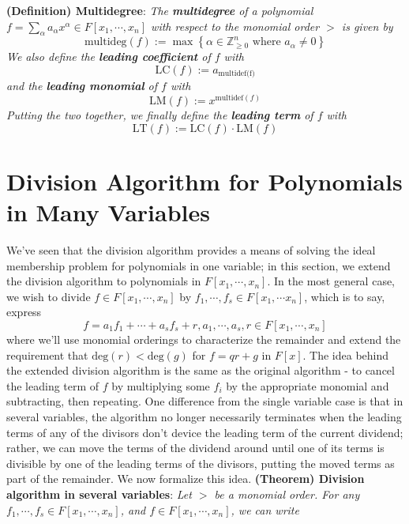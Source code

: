 \documentclass{article}
\begin{document}
\newline \newline
\textbf{(Definition) Multidegree}: \textit{The \textbf{multidegree} of a polynomial $ f = \sum_{\alpha} a_{\alpha} x^\alpha \in F[x_1, \cdots, x_n] $ with respect to the monomial order $ > $ is given by}
$$ \text{multideg}(f) := \max \left\{ \alpha \in \mathbb{Z}_{\geq 0}^n \text{ where } a_{\alpha} \neq 0 \right\} $$
\indent \textit{We also define the \textbf{leading coefficient} of $ f $ with}
$$ \text{LC}(f) := a_{\text{multidef(f)}} $$
\indent \textit{and the \textbf{leading monomial} of $ f $ with}
$$ \text{LM}(f) := x^{\text{multidef}(f)} $$
\indent \textit{Putting the two together, we finally define the \textbf{leading term} of $ f $ with}
$$ \text{LT}(f) := \text{LC}(f) \cdot \text{LM}(f) $$

\section{Division Algorithm for Polynomials in Many Variables}
We've seen that the division algorithm provides a means of solving the ideal membership problem for polynomials in one variable; in this section, we extend the division algorithm to polynomials in $ F[x_1, \cdots, x_n] $. In the most general case, we wish to divide $ f \in F[x_1, \cdots, x_n] $ by $ f_1, \cdots, f_s \in F[x_1, \cdots x_n] $, which is to say, express
$$ f = a_1 f_1 + \cdots + a_s f_s + r, a_1, \cdots, a_s, r \in F[x_1, \cdots, x_n] $$
where we'll use monomial orderings to characterize the remainder and extend the requirement that $ \text{deg}(r) < \text{deg}(g) $ for $ f = q r + g $ in $ F[x] $.
\newline
The idea behind the extended division algorithm is the same as the original algorithm - to cancel the leading term of $ f $ by multiplying some $ f_i $ by the appropriate monomial and subtracting, then repeating. One difference from the single variable case is that in several variables, the algorithm no longer necessarily terminates when the leading terms of any of the divisors don't device the leading term of the current dividend; rather, we can move the terms of the dividend around until one of its terms is divisible by one of the leading terms of the divisors, putting the moved terms as part of the remainder. We now formalize this idea.
\newline \newline
\textbf{(Theorem) Division algorithm in several variables}: \textit{Let $ > $ be a monomial order. For any $ f_1, \cdots, f_s \in F[x_1, \cdots, x_n] $, and $ f \in F[x_1, \cdots, x_n] $, we can write}
\end{document}
